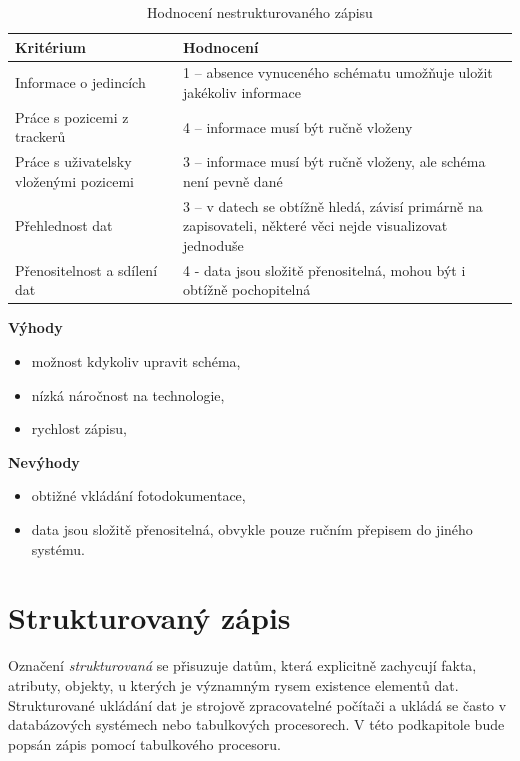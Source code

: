 \begin{table}[H]
	\begin{tabularx}{\textwidth}{ | X | X | }
		\hline
		Kritérium                              & Hodnocení \\
 		\hline			
		Informace o jedincích                  & 1 -- absence vynuceného schématu umožňuje uložit jakékoliv informace          \\
		\hline
		Práce s pozicemi z trackerů            & 4 -- informace musí být ručně vloženy          \\
		\hline
		Práce s uživatelsky vloženými pozicemi & 3 -- informace musí být ručně vloženy, ale schéma není pevně dané          \\
		\hline
		Přehlednost dat                        & 3 -- v datech se obtížně hledá, závisí primárně na zapisovateli, některé věci nejde visualizovat jednoduše          \\
		\hline
		Přenositelnost a sdílení dat           & 4 - data jsou složitě přenositelná, mohou být i obtížně pochopitelná          \\
		\hline	
	\end{tabularx}
	\caption{Hodnocení nestrukturovaného zápisu}
\end{table}
\clearpage
\textbf{Výhody}
\nolisttopbreak
\begin{itemize}
	\item možnost kdykoliv upravit schéma,
	\item nízká náročnost na technologie,
	\item rychlost zápisu,
\end{itemize}

\textbf{Nevýhody}
\nolisttopbreak
\begin{itemize}
	\item obtižné vkládání fotodokumentace,
	\item data jsou složitě přenositelná, obvykle pouze ručním přepisem do jiného systému.
\end{itemize}

\section{Strukturovaný zápis}

Označení \emph{strukturovaná} se přisuzuje datům, která explicitně zachycují fakta, atributy, objekty, u kterých je významným rysem existence elementů dat. Strukturované ukládání dat je strojově zpracovatelné počítači a ukládá se často v databázových systémech \cite{sklenák2001data} nebo tabulkových procesorech. V této podkapitole bude popsán zápis pomocí tabulkového procesoru.

